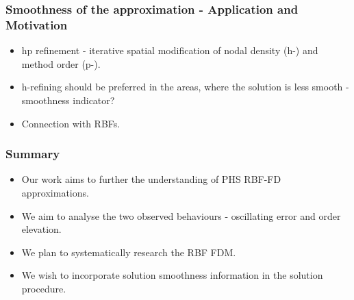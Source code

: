 \documentclass{beamer}
\begin{document}
\begin{frame}
\frametitle{Smoothness of the approximation - Application and Motivation}
\begin{itemize}
\item<1-> hp refinement - iterative spatial modification of nodal density (h-) and method order (p-).
\item<2-> h-refining should be preferred in the areas, where the solution is less smooth - smoothness indicator?
\item<3-> Connection with RBFs.
\end{itemize}
\end{frame}


\begin{frame}
\frametitle{Summary}
\begin{itemize}
\item<1-> Our work aims to further the understanding of PHS RBF-FD approximations.
\item<2-> We aim to analyse the two observed behaviours - oscillating error and order elevation. 
\item<3-> We plan to systematically research the RBF FDM.
\item<4-> We wish to incorporate solution smoothness information in the solution procedure.
\end{itemize}
\end{frame}
\end{document}
